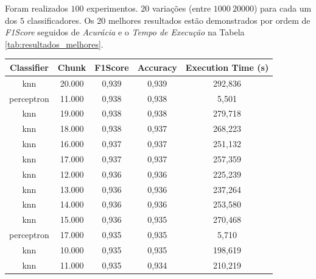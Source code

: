 \documentclass[12pt]{article}
\begin{document}
Foram realizados $100$ experimentos. $20$ variações (entre $1000~20000$) para cada um dos $5$ classificadores. Os $20$ melhores resultados estão demonstrados por ordem de \textit{F1Score} seguidos de \textit{Acurácia} e o \textit{Tempo de Execução} na Tabela \ref{tab:resultados_melhores}.

\newpage

\begin{table}[!htb]
  \centering
  \scriptsize
\begin{tabular}{|c|c|c|c|c|}
\hline
\textbf{Classifier} & \textbf{Chunk} & \textbf{F1Score} & \textbf{Accuracy} & \textbf{Execution Time (s)} \\ \hline
knn                 & 20.000         & 0,939            & 0,939             & 292,836                     \\ \hline
perceptron          & 11.000         & 0,938            & 0,938             & 5,501                       \\ \hline
knn                 & 19.000         & 0,938            & 0,938             & 279,718                     \\ \hline
knn                 & 18.000         & 0,938            & 0,937             & 268,223                     \\ \hline
knn                 & 16.000         & 0,937            & 0,937             & 251,132                     \\ \hline
knn                 & 17.000         & 0,937            & 0,937             & 257,359                     \\ \hline
knn                 & 12.000         & 0,936            & 0,936             & 225,239                     \\ \hline
knn                 & 13.000         & 0,936            & 0,936             & 237,264                     \\ \hline
knn                 & 14.000         & 0,936            & 0,936             & 253,580                     \\ \hline
knn                 & 15.000         & 0,936            & 0,935             & 270,468                     \\ \hline
perceptron          & 17.000         & 0,935            & 0,935             & 5,710                       \\ \hline
knn                 & 10.000         & 0,935            & 0,935             & 198,619                     \\ \hline
knn                 & 11.000         & 0,935            & 0,934             & 210,219                     \\ \hline

\end{tabular}
\end{table}
\end{document}
